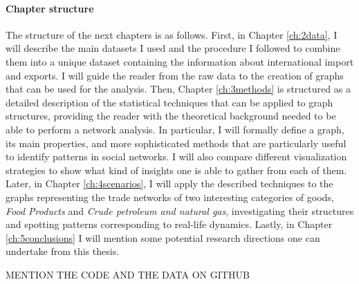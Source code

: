 \paragraph{Chapter structure}

The structure of the next chapters is as follows. First, in Chapter \ref{ch:2data}, I will describe the main datasets I used and the procedure I followed to combine them into a unique dataset containing the information about international import and exports. I will guide the reader from the raw data to the creation of graphs that can be used for the analysis. Then, Chapter \ref{ch:3methods} is structured as a detailed description of the statistical techniques that can be applied to graph structures, providing the reader with the theoretical background needed to be able to perform a network analysis. In particular, I will formally define a graph, its main properties, and more sophisticated methods that are particularly useful to identify patterns in social networks. I will also compare different visualization strategies to show what kind of insights one is able to gather from each of them. Later, in Chapter \ref{ch:4scenarios}, I will apply the described techniques to the graphs representing the trade networks of two interesting categories of goods, \textit{Food Products} and \textit{Crude petroleum and natural gas}, investigating their structures and spotting patterns corresponding to real-life dynamics. Lastly, in Chapter \ref{ch:5conclusions} I will mention some potential research directions one can undertake from this thesis. 

MENTION THE CODE AND THE DATA ON GITHUB
